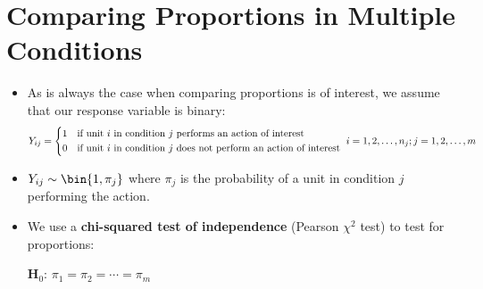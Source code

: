 \section{Comparing Proportions in Multiple Conditions}
\begin{itemize}
      \item As is always the case when comparing proportions is of interest, we assume that our response variable
            is binary:
            \[ Y_{ij}=\begin{cases*}
                        1 & if unit $ i $ in condition $ j $ performs an action of interest         \\
                        0 & if unit $ i $ in condition $ j $ does not perform an action of interest
                  \end{cases*}i=1,2,\ldots,n_j;j=1,2,\ldots,m \]
      \item $ Y_{ij}\sim \bin{1,\pi_j} $
            where $ \pi_j $ is the probability of a unit in condition $ j $ performing the action.
      \item We use a \textbf{chi-squared test of independence} (Pearson $ \chi^2 $ test) to test for proportions:
            \begin{tightcenter}
                  $ \mathbf{H}_0 $: $ \pi_1=\pi_2=\cdots=\pi_m $
            \end{tightcenter}
\end{itemize}
